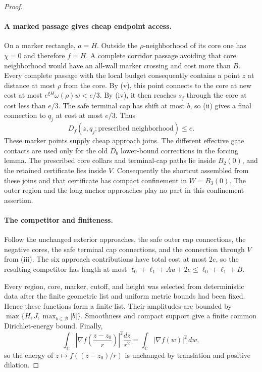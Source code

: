 \begin{proof}
\paragraph{A marked passage gives cheap endpoint access.}
On a marker rectangle, $a=H$.  Outside the
$\rho$-neighborhood of its core one has $\chi=0$ and
therefore $f=H$.  A complete corridor passage avoiding
that core neighborhood would have an all-wall marker
crossing and cost more than $B$.  Every complete passage
with the local budget consequently contains a point $z$
at distance at most $\rho$ from the core.  By (v), this
point connects to the core at new cost at most
$e^{\xi H}\omega(\rho)w<e/3$.  By (iv), it then reaches
$s_j$ through the core at cost less than $e/3$.  The safe
terminal cap has shift at most $b$, so (ii) gives a final
connection to $q_j$ at cost at most $e/3$.  Thus
\[
 D_f(z,q_j;\text{prescribed neighborhood})\le e.
\]
These marker points supply cheap approach joins.  The
different effective gate contacts are used only for the
old $D_b$ lower-bound corrections in the forcing lemma.
The prescribed core collars and terminal-cap paths lie inside
$B_2(0)$, and the retained certificate lies inside $V$.
Consequently the shortcut assembled from these joins and that
certificate has compact confinement in $W=B_3(0)$.  The outer
region and the long anchor approaches play no part in this
confinement assertion.

\paragraph{The competitor and finiteness.}
Follow the unchanged exterior approaches, the safe outer
cap connections, the negative cores, the safe terminal
cap connections, and the connection through $V$ from (iii).
The six approach contributions have total cost at most
$2e$, so the resulting competitor has length at most
$\ell_0+\ell_1+Au+2e\le\ell_0+\ell_1+B$.

Every region, core, marker, cutoff, and height was selected
from deterministic data after the finite geometric list
and uniform metric bounds had been fixed.  Hence these
functions form a finite list.  Their amplitudes are
bounded by $\max\{H,J,\max_{b\in\mathcal B}|b|\}$.
Smoothness and compact support give a finite common
Dirichlet-energy bound.  Finally,
\[
 \int_{\mathbb C}
 \left|\nabla f\left(\frac{z-z_0}{r}\right)\right|^2
 \frac{dz}{r^2}
 =\int_{\mathbb C}|\nabla f(w)|^2\,dw,
\]
so the energy of $z\mapsto f((z-z_0)/r)$ is unchanged
by translation and positive dilation.
\end{proof}

